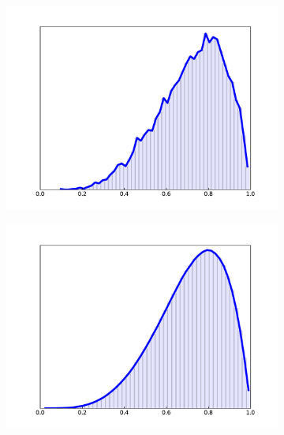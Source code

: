 \begin{figure}[H] %
\captionsetup[subfigure]{justification=centering}
\centering
\begin{subfigure}{.49\textwidth}
    \centering
    \includegraphics[width=\linewidth]{figures/hist_3_bad.pdf}
\end{subfigure}
%
\begin{subfigure}{.49\textwidth}
    \centering
    \includegraphics[width=\linewidth]{figures/hist_3_good.pdf}
\end{subfigure}
\end{figure}

